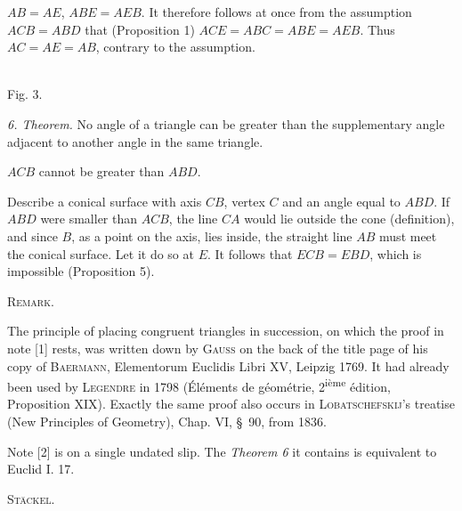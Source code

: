 $AB = AE$, $ABE = AEB$. It therefore follows at once from the assumption $ACB = ABD$ that
(Proposition 1) $ACE = ABC = ABE = AEB$. Thus $AC = AE = AB$, contrary to the assumption.

\begin{center}
\\[3pt]Fig. 3.
\end{center}

\emph{6. Theorem.} No angle of a triangle can be greater than the supplementary angle adjacent to
another angle in the same triangle.

$ACB$ cannot be greater than $ABD$.

 Describe a conical surface with axis $CB$, vertex $C$ and an angle equal to $ABD$.
If $ABD$ were smaller than $ACB$, the line $CA$ would lie outside the
cone (definition), and since $B$, as a point on the axis, lies inside,
the straight line $AB$ must meet the conical surface. Let it do so at $E$. It follows that
$ECB = EBD$, which is impossible (Proposition 5).


 

\begin{center}

\end{center}

\begin{center}\textsc{Remark.}\end{center}


The principle of placing congruent triangles in succession, on which the proof in
note [1] rests, was written down by \textsc{Gauss} on the back of the title page of his copy
of \textsc{Baermann}, Elementorum Euclidis Libri XV, Leipzig 1769. It had already been used
by \textsc{Legendre} in 1798 (Éléments de géométrie, 2\textsuperscript{ième} édition,
Proposition XIX). Exactly the same proof also occurs in \textsc{Lobatschefskij}'s
treatise  (New Principles of Geometry), Chap. VI,
\S\ 90, from 1836.

Note [2] is on a single undated slip. The
\emph{Theorem 6} it contains is equivalent to Euclid I. 17.

\begin{flushright}\textsc{Stäckel.}\end{flushright}

